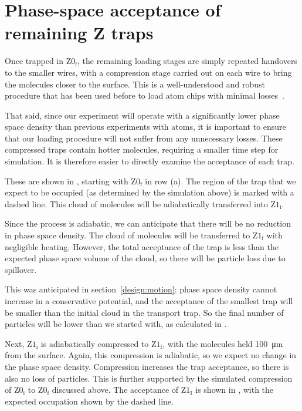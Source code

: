 \section{Phase-space acceptance of remaining Z traps}
\label{design:transferbetweenzs}


Once trapped in $\mathrm{Z0_f}$, the remaining loading stages are simply
repeated handovers to the smaller wires, with a compression stage carried out
on each wire to bring the molecules closer to the surface. This is a
well-understood and robust procedure that has been used before to load atom
chips with minimal losses~\cite{Reichel2002}.

That said, since our experiment will operate with a significantly lower phase
space density than previous experiments with atoms, it is important to ensure
that our loading procedure will not suffer from any unnecessary losses. These
compressed traps contain hotter molecules, requiring a smaller time step for
simulation. It is therefore easier to directly examine the acceptance of each
trap.

These are shown in , starting with
$\mathrm{Z0_f}$ in row (a). The region of the trap that we expect to be
occupied (as determined by the simulation above) is marked with a dashed line.
This cloud of molecules will be adiabatically transferred into $\mathrm{Z1_i}$.

Since the process is adiabatic, we can anticipate that there will be no
reduction in phase space density. The cloud of molecules will be transferred to
$\mathrm{Z1_i}$ with negligible heating. However, the total acceptance of the
trap is less than the expected phase space volume of the cloud, so there
will be particle loss due to spillover.

This was anticipated in section~\ref{design:motion}: phase space density cannot
increase in a conservative potential, and the acceptance of the smallest trap
will be smaller than the initial cloud in the transport trap. So the final
number of particles will be lower than we started with, as calculated in
.

Next, $\mathrm{Z1_i}$ is adiabatically compressed to $\mathrm{Z1_f}$, with the
molecules held \SI{100}{\micro\meter} from the surface. Again, this
compression is adiabatic, so we expect no change in the phase space density.
Compression increases the trap acceptance, so there is also no loss of
particles. This is further supported by the simulated compression of
$\mathrm{Z0_i}$ to $\mathrm{Z0_f}$ discussed above. The acceptance of
$\mathrm{Z1_I}$ is shown in , with
the expected occupation shown by the dashed line.

